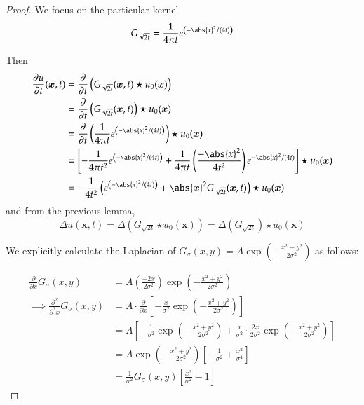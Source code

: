     \begin{proof}
    	We focus on the particular kernel
    	\[
    	G_{\sqrt{2t}} = \frac{1}{4\pi t} e^{\left(-\abs{x}^2 / (4t)\right)}
    	\]
    	
    	
    	Then
    	\begin{align}
    	\frac{\partial u}{\partial t} (\bm{x}, t)
    	&= \frac{\partial}{\partial t} \left(G_{\sqrt{2t}}(\bm{x},t) \star u_0(\bm{x})\right)  \\
    	&= \frac{\partial}{\partial t} \left(G_{\sqrt{2t}}(\bm{x},t)\right) \star u_0(\bm{x})  \\
    	&= \frac{\partial}{\partial t} \left(
    	\frac{1}{4\pi t} e^{\left(-\abs{x}^2 / (4t)\right)} \right) \star u_0(\bm{x}) \\
    	&= \left[
    	-\frac{1}{4\pi t^2} e^{\left(-\abs{x}^2 / (4t)\right)}
    	+ \frac{1}{4\pi t}\left(\frac{-\abs{x}^2}{4t^2}\right) e^{-\abs{x}^2 / (4t)}
    	\right] \star u_0(\bm{x}) \\
    	&= -\frac{1}{4t^2} \left( e^{\left(-\abs{x}^2 / (4t)\right)} 
    	+ \abs{\bm{x}}^2 G_{\sqrt{2t}}(\bm{x},t)
    	\right) \star u_0(\bm{x})
    	\end{align}
    	and from the previous lemma,
    	\[
    	\Delta u(\bm{x}, t) = \Delta\left( G_{\sqrt{2t}} \star u_0(\bm{x})\right)
    	= \Delta\left( G_{\sqrt{2t}} \right)\star u_0(\bm{x})
    	\]
    	
    	We explicitly calculate the Laplacian of $G_{\sigma}(x,y) = A \exp(-\frac{x^2 + y^2}{2\sigma^2})$ as follows:
    	
    	\begin{align*}
    	\frac{\partial}{\partial x} G_{\sigma}(x,y)
    	&= A \left( \frac{-2x}{2\sigma^2}\right) \exp\left(-\frac{x^2 + y^2}{2\sigma^2}\right) \\
    	\implies \frac{\partial^2}{\partial^2 x} G_{\sigma}(x,y)
    	&= A \cdot \frac{\partial}{\partial x}
    	\left[ - \frac{x}{\sigma^2} \exp\left(-\frac{x^2 + y^2}{2\sigma^2}\right) \right] \\
    	&= A \left[ - \frac{1}{\sigma^2} \exp\left(-\frac{x^2 + y^2}{2\sigma^2}\right) 
    	+ \frac{x}{\sigma^2} \cdot \frac{2x}{2\sigma^2} \exp\left(-\frac{x^2 + y^2}{2\sigma^2}\right) \right] \\
    	&= A \exp\left(-\frac{x^2 + y^2}{2\sigma^2}\right)
    	\left[ - \frac{1}{\sigma^2} + \frac{x^2}{\sigma^4} \right] \\
    	&= \frac{1}{\sigma^2} G_\sigma(x,y)  \left[ \frac{x^2}{\sigma^2} - 1\right]
    	\end{align*}
    	

\end{proof}
